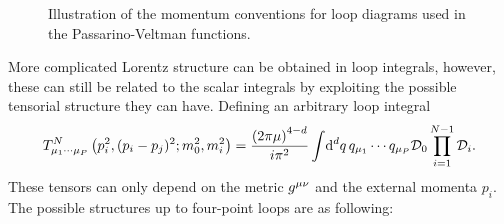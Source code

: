 \documentclass[../main.tex]{subfiles}
\begin{document}
\begin{figure}[ht!]
    \centering
    \begin{subfigure}{0.49\linewidth}
        \centering
        \caption{}
        \label{qft:fig:PV_triloop_conventions}
    \end{subfigure}
    \begin{subfigure}{0.49\linewidth}
        \centering
        \caption{}
        \label{qft:fig:PV_boxloop_conventions}
    \end{subfigure}
    \caption{Illustration of the momentum conventions for loop diagrams used in
        the Passarino-Veltman functions.}
    \label{qft:fig:PV_loop_conventions}
\end{figure}

More complicated Lorentz structure can be obtained in loop integrals, however,
these can still be related to the scalar integrals by exploiting the possible
tensorial structure they can have. Defining an arbitrary loop integral
\begin{equation}
    T^N_{\mu_1\cdots\mu_P}\left(p_i^2, (p_i-p_j)^2; m_0^2, m_i^2\right) =
    \frac{\left(2\pi \mu\right)^{4-d}}{i \pi^2} \int \!\mathrm{d}^d q\, q_{\mu_1}\cdots
    q_{\mu_P} \mathcal{D}_0 \prod_{i=1}^{N-1} \mathcal{D}_i.
\end{equation}
These tensors can only depend on the metric \(\tensor{g}{^\mu^\nu}\) and the
external momenta \(p_i\).
The possible structures up to four-point loops are as following:
\end{document}
